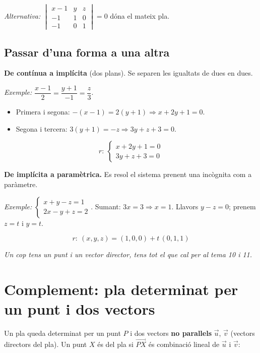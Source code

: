 \emph{Alternativa:} $\begin{vmatrix}x-1&y&z\\-1&1&0\\-1&0&1\end{vmatrix}=0$ dóna el mateix pla.

\subsection{Passar d'una forma a una altra}

\textbf{De contínua a implícita} (dos plans). Se separen les igualtats de dues en dues.

\emph{Exemple:} $\dfrac{x-1}{2}=\dfrac{y+1}{-1}=\dfrac{z}{3}$.

\begin{itemize}
\item Primera i segona: $-(x-1)=2(y+1)\Rightarrow x+2y+1=0$.
\item Segona i tercera: $3(y+1)=-z\Rightarrow 3y+z+3=0$.
\end{itemize}

\begin{equation*}
r:\ \begin{cases}x+2y+1=0\\3y+z+3=0\end{cases}
\end{equation*}

\textbf{De implícita a paramètrica.} Es resol el sistema prenent una incògnita com a paràmetre.

\emph{Exemple:} $\begin{cases}x+y-z=1\\2x-y+z=2\end{cases}$. Sumant: $3x=3\Rightarrow x=1$. Llavors $y-z=0$; prenem $z=t$ i $y=t$.

\begin{equation*}
r:\ (x,y,z)=(1,0,0)+t\,(0,1,1)
\end{equation*}

\emph{Un cop tens un punt i un vector director, tens tot el que cal per al tema 10 i 11.}

\section{Complement: pla determinat per un punt i dos vectors}

Un pla queda determinat per un punt $P$ i dos vectors \textbf{no paral\textperiodcentered{}lels} $\vec u$, $\vec v$ (vectors directors del pla). Un punt $X$ és del pla si $\overrightarrow{PX}$ és combinació lineal de $\vec u$ i $\vec v$:

